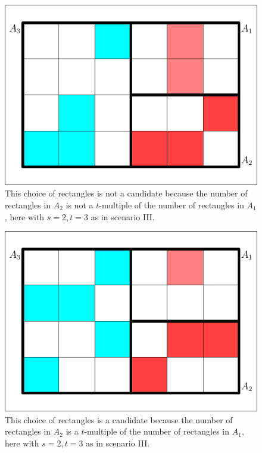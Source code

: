 \documentclass[12pt]{article}
\begin{document}
\begin{figure}[h]
  \begin{flushright}
    \begin{minipage}[h]{\lwv\linewidth}
      \includegraphics[width=\textwidth]{partition-2.pdf}
      \caption{This choice of rectangles is not a candidate because
        the number of rectangles in $A_{2}$ is not a $t$-multiple of
        the number of rectangles in $A_{1}$, here with $s=2,t=3$ as in
        scenario III.}
      \label{fig:pwstex1}
    \end{minipage}
  \end{flushright}
\end{figure}

\begin{figure}[h]
  \begin{flushright}
    \begin{minipage}[h]{\lwv\linewidth}
      \includegraphics[width=\textwidth]{partition-1.pdf}
      \caption{This choice of rectangles is a candidate because the
        number of rectangles in $A_{2}$ is a $t$-multiple of the
        number of rectangles in $A_{1}$, here with $s=2,t=3$ as in
        scenario III.}
      \label{fig:pwstex2}
    \end{minipage}
  \end{flushright}
\end{figure}
\end{document}
